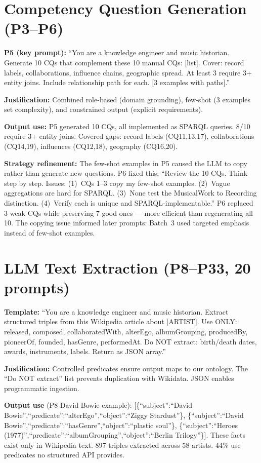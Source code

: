 \documentclass[11pt,a4paper]{article}
\begin{document}
\section{Competency Question Generation (P3--P6)}

\textbf{P5 (key prompt):} ``You are a knowledge engineer and music historian. Generate 10 CQs that complement these 10 manual CQs: [list]. Cover: record labels, collaborations, influence chains, geographic spread. At least 3 require 3+ entity joins. Include relationship path for each. [3 examples with paths].''

\textbf{Justification:} Combined role-based (domain grounding), few-shot (3 examples set complexity), and constrained output (explicit requirements).

\textbf{Output use:} P5 generated 10 CQs, all implemented as SPARQL queries. 8/10 require 3+ entity joins. Covered gaps: record labels (CQ11,13,17), collaborations (CQ14,19), influences (CQ12,18), geography (CQ16,20).

\textbf{Strategy refinement:} The few-shot examples in P5 caused the LLM to copy rather than generate new questions. P6 fixed this: ``Review the 10 CQs. Think step by step. Issues: (1)~CQs 1--3 copy my few-shot examples. (2)~Vague aggregations are hard for SPARQL. (3)~None test the MusicalWork to Recording distinction. (4)~Verify each is unique and SPARQL-implementable.'' P6 replaced 3 weak CQs while preserving 7 good ones --- more efficient than regenerating all 10. The copying issue informed later prompts: Batch~3 used targeted emphasis instead of few-shot examples.

\section{LLM Text Extraction (P8--P33, 20 prompts)}

\textbf{Template:} ``You are a knowledge engineer and music historian. Extract structured triples from this Wikipedia article about [ARTIST]. Use ONLY: released, composed, collaboratedWith, alterEgo, albumGrouping, producedBy, pioneerOf, founded, hasGenre, performedAt. Do NOT extract: birth/death dates, awards, instruments, labels. Return as JSON array.''

\textbf{Justification:} Controlled predicates ensure output maps to our ontology. The ``Do NOT extract'' list prevents duplication with Wikidata. JSON enables programmatic ingestion.

\textbf{Output use} (P8 David Bowie example): [\{``subject'':``David Bowie'',``predicate'':``alterEgo'',``object'':``Ziggy Stardust''\}, \{``subject'':``David Bowie'',``predicate'':``hasGenre'',``object'':``plastic soul''\}, \{``subject'':``Heroes (1977)'',``predicate'':``albumGrouping'',``object'':``Berlin Trilogy''\}]. These facts exist only in Wikipedia text. 897 triples extracted across 58 artists. 44\% use predicates no structured API provides.
\end{document}
